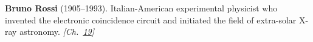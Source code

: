 \textbf{Bruno Rossi} (1905–1993). Italian-American experimental physicist who invented the electronic coincidence circuit and initiated the field of extra-solar X-ray astronomy. \emph{[Ch.~\hyperref[ch:cosmicraymuons]{19}]}

